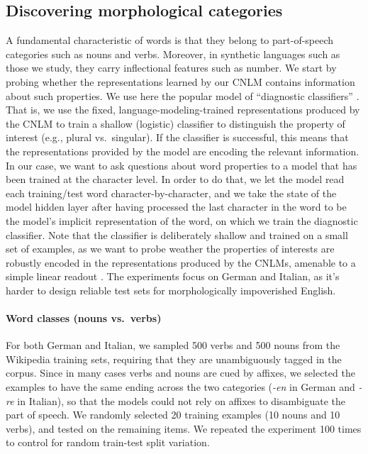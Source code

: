 \subsection{Discovering morphological categories}
\label{sec:categories}

A fundamental characteristic of words is that they belong to
part-of-speech categories such as nouns and verbs. Moreover, in
synthetic languages such as those we study, they carry inflectional
features such as number. We start by probing whether the
representations learned by our CNLM contains information about such
properties. We use here the popular model of ``diagnostic
classifiers'' \cite{Hupkes:etal:2017}. That is, we use the fixed,
language-modeling-trained representations produced by the CNLM to
train a shallow (logistic) classifier to distinguish the property of
interest (e.g., plural vs.~singular). If the classifier is successful,
this means that the representations provided by the model are encoding
the relevant information. In our case, we want to ask questions about
word properties to a model that has been trained at the character
level. In order to do that, we let the model read each training/test
word character-by-character, and we take the state of the model hidden
layer after having processed the last character in the word to be the
model's implicit representation of the word, on which we train the
diagnostic classifier. Note that the classifier is deliberately
shallow and trained on a small set of examples, as we want to probe
weather the properties of interests are robustly encoded in the
representations produced by the CNLMs, amenable to a simple linear
readout \cite{Fusi:etal:2016}. %
The experiments focus on German and Italian, as it's harder to design
reliable test sets for morphologically impoverished English.

\paragraph{Word classes (nouns vs.~verbs)}

For both German and Italian, we sampled 500 verbs and 500 nouns from
the Wikipedia training sets, requiring that they are unambiguously
tagged in the corpus. Since in many cases verbs and nouns are cued by
affixes, we selected the examples to have the same ending across the
two categories (\emph{-en} in German and \emph{-re} in Italian), so
that the models could not rely on affixes to disambiguate the part of
speech. We randomly selected 20 training examples (10 nouns and 10
verbs), and tested on the remaining items.  We repeated the experiment
100 times to control for random train-test split variation.

